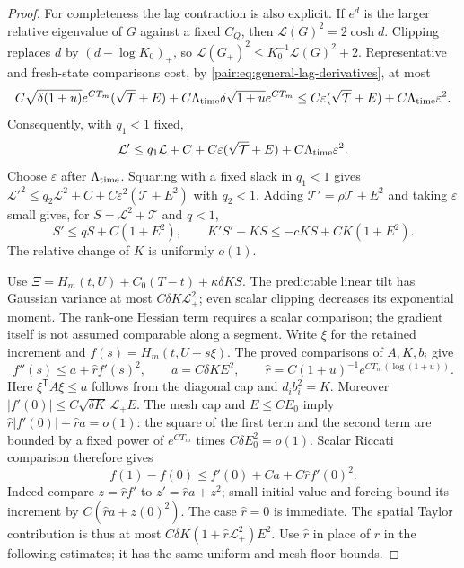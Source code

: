 \documentclass[11pt]{article}
\numberwithin{equation}{section}
\begin{document}
\begin{proof}
For completeness the lag contraction is also explicit. If $e^d$
is the larger relative eigenvalue of $G$ against a fixed $C_Q$,
then $\mathcal L(G)^2=2\cosh d$. Clipping replaces $d$ by
$(d-\log K_0)_+$, so
$\mathcal L(G_+)^2\le K_0^{-1}\mathcal L(G)^2+2$.
Representative and fresh-state comparisons cost, by
\eqref{pair:eq:general-lag-derivatives}, at most
\[
 C\sqrt{\delta(1+u)}e^{CT_m}(\sqrt{\mathcal T}+E)
 +C\Lambda_{\rm time}\delta\sqrt{1+u}e^{CT_m}
 \le C\varepsilon(\sqrt{\mathcal T}+E)+C\Lambda_{\rm time}\varepsilon^2.
\]
Consequently, with $q_1<1$ fixed,
\[
 \mathcal L'\le q_1\mathcal L+
 C+C\varepsilon(\sqrt{\mathcal T}+E)
                  +C\Lambda_{\rm time}\varepsilon^2.
\]
Choose $\varepsilon$ after $\Lambda_{\rm time}$. Squaring with a
fixed slack in $q_1<1$ gives
$\mathcal L'^2\le q_2\mathcal L^2+C+
C\varepsilon^2(\mathcal T+E^2)$ with $q_2<1$.
Adding $\mathcal T'=\rho\mathcal T+E^2$ and taking $\varepsilon$
small gives,
for $S=\mathcal L^2+\mathcal T$ and $q<1$,
\begin{equation}\label{pair:eq:general-memory}
 S'\le qS+C(1+E^2),\qquad K'S'-KS\le-cKS+CK(1+E^2).
\end{equation}
The relative change of $K$ is uniformly $o(1)$.

Use $\Xi=H_m(t,U)+C_0(T-t)+\kappa\delta KS$.
The predictable linear tilt has Gaussian variance at most
$C\delta K\mathcal L_+^2$; even scalar clipping decreases its
exponential moment. The rank-one Hessian term requires a scalar
comparison; the gradient itself is not assumed comparable along a
segment. Write $\xi$ for the retained increment and
$f(s)=H_m(t,U+s\xi)$. The proved comparisons of $A,K,b_i$ give
\[
 f''(s)\le a+\widehat r f'(s)^2,\qquad
 a=C\delta KE^2,\qquad
 \widehat r=C(1+u)^{-1}e^{CT_m(\log(1+u))}.
\]
Here $\xi^{\mathsf T}A\xi\le a$ follows from the diagonal cap and
$d_ib_i^2=K$. Moreover
$|f'(0)|\le C\sqrt{\delta K}\,\mathcal L_+E$.
The mesh cap and $E\le CE_0$ imply
$\widehat r|f'(0)|+\widehat r a=o(1)$:
the square of the first term and the second term are bounded by
a fixed power of $e^{CT_m}$ times $C\delta E_0^2=o(1)$.
Scalar Riccati comparison therefore gives
\[
 f(1)-f(0)\le f'(0)+Ca+C\widehat r f'(0)^2.
\]
Indeed compare $z=\widehat r f'$ to
$z'=\widehat r a+z^2$; small initial value and forcing bound its
increment by $C(\widehat r a+z(0)^2)$. The case $\widehat r=0$
is immediate. The spatial Taylor contribution is thus at most
$C\delta K(1+\widehat r\mathcal L_+^2)E^2$.
Use $\widehat r$ in place of $r$ in the following estimates;
it has the same uniform and mesh-floor bounds.


\end{proof}
\end{document}
